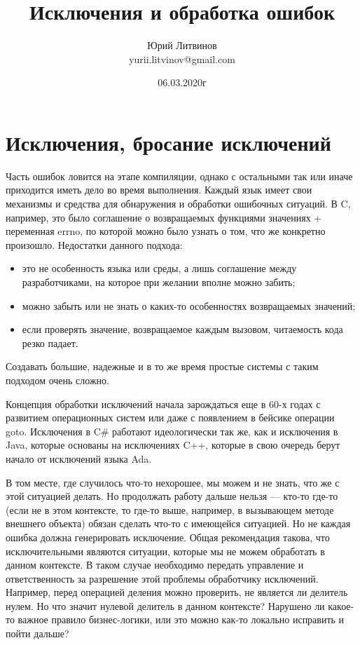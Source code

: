\documentclass[a5paper]{article}
\title{Исключения и обработка ошибок}
\author{Юрий Литвинов\\\small{yurii.litvinov@gmail.com}}
\date{06.03.2020г}
\begin{document}
\maketitle
\thispagestyle{empty}

\section{Исключения, бросание исключений}

Часть ошибок ловится на этапе компиляции, однако с остальными так или иначе приходится иметь дело во время выполнения. Каждый язык имеет свои механизмы и средства для обнаружения и обработки ошибочных ситуаций. В C, например, это было соглашение о возвращаемых функциями значениях + переменная errno, по которой можно было узнать о том, что же конкретно произошло. Недостатки данного подхода:

\begin{itemize}
    \item это не особенность языка или среды, а лишь соглашение между разработчиками, на которое при желании вполне можно забить;
    \item можно забыть или не знать о каких-то особенностях возвращаемых значений;
    \item если проверять значение, возвращаемое каждым вызовом, читаемость кода резко падает.
\end{itemize}

Создавать большие, надежные и в то же время простые системы с таким подходом очень сложно.

Концепция обработки исключений начала зарождаться еще в 60-х годах с развитием операционных систем или даже с появлением в бейсике операции goto. Исключения в C\# работают идеологически так же, как и исключения в Java, которые основаны на исключениях C++, которые в свою очередь берут начало от исключений языка Ada.

В том месте, где случилось что-то нехорошее, мы можем и не знать, что же с этой ситуацией делать. Но продолжать работу дальше нельзя --- кто-то где-то (если не в этом контексте, то где-то выше, например, в вызывающем методе внешнего объекта) обязан сделать что-то с имеющейся ситуацией. Но не каждая ошибка должна генерировать исключение. Общая рекомендация такова, что исключительными являются ситуации, которые мы не можем обработать в данном контексте. В таком случае необходимо передать управление и ответственность за разрешение этой проблемы обработчику исключений. Например, перед операцией деления можно проверить, не является ли делитель нулем. Но что значит нулевой делитель в данном контексте? Нарушено ли какое-то важное правило бизнес-логики, или это можно как-то локально исправить и пойти дальше?
\end{document}
